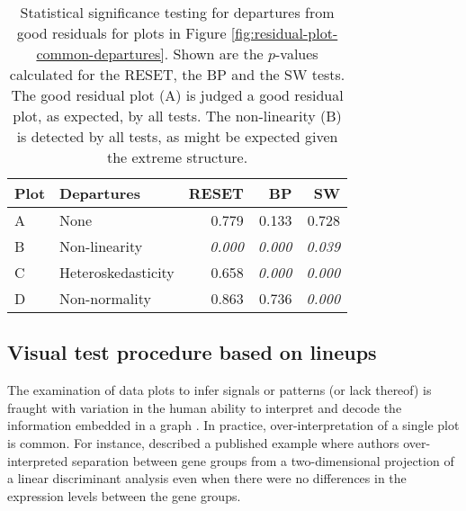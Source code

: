 \documentclass[]{interact}
\theoremstyle{plain}%
\theoremstyle{definition}
\theoremstyle{remark}
\begin{document}
\begin{table}

\caption{\label{tab:example-residual-plot-table}Statistical significance testing for departures from good residuals for plots in Figure \ref{fig:residual-plot-common-departures}. Shown are the $p$-values calculated for the RESET, the BP and the SW tests. The good residual plot (A) is judged a good residual plot, as expected, by all tests. The non-linearity (B) is detected by all tests, as might be expected given the extreme structure.}
\centering
\begin{tabular}[t]{llrrr}
\toprule
Plot & Departures & RESET & BP & SW\\
\midrule
A & None & 0.779 & 0.133 & 0.728\\
B & Non-linearity & \em{0.000} & \em{0.000} & \em{0.039}\\
C & Heteroskedasticity & 0.658 & \em{0.000} & \em{0.000}\\
D & Non-normality & 0.863 & 0.736 & \em{0.000}\\
\bottomrule
\end{tabular}
\end{table}

\hypertarget{visual-test-procedure-based-on-lineups}{%
\subsection{Visual test procedure based on
lineups}\label{visual-test-procedure-based-on-lineups}}

The examination of data plots to infer signals or patterns (or lack
thereof) is fraught with variation in the human ability to interpret and
decode the information embedded in a graph
\citep{cleveland1984graphical}. In practice, over-interpretation of a
single plot is common. For instance, \citet{roy2015using} described a
published example where authors over-interpreted separation between gene
groups from a two-dimensional projection of a linear discriminant
analysis even when there were no differences in the expression levels
between the gene groups.
\end{document}
